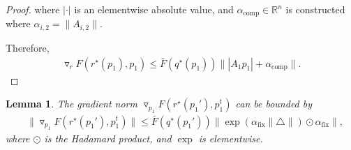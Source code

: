 \documentclass[table]{ai2style/ai2}
\newtheorem{lemma}{Lemma}
\newcommand{\R}[0]{\mathbb{R}}
\newcommand{\alphafix}[0]{\alpha_{\text{fix}}}
\newcommand{\alphacomp}[0]{\alpha_{\text{comp}}}
\begin{document}
\begin{proof}
where $| \cdot |$ is an elementwise absolute value, and $\alphacomp \in \R^n$ is constructed where $\alpha_{i, 2} = \|A_{i, 2}\|$. 

Therefore,
\begin{align*}
    \triangledown_r F(r^\star(p_1), p_1) \le \bar{F}(q^\star(p_1))  \big\| | A_1 p_1 | + \alphacomp \big\|.
\end{align*}

\end{proof}

\begin{lemma}\label{lemma:grad_p_1}
    The gradient norm $\triangledown_{p_1} F(r^\star(p_1'), p_1^t)$ can be bounded by 
    \begin{align*}
        &\|\triangledown_{p_1} F(r^\star(p_1'), p_1^t)\| \le  \bar{F}(q^\star(p_1'))  \big\|  \exp( \alphafix \|\triangle \|) \odot \alphafix   \big\|,
    \end{align*}
    where $\odot$ is the Hadamard product, and $\exp$ is elementwise.
\end{lemma}
\end{document}
